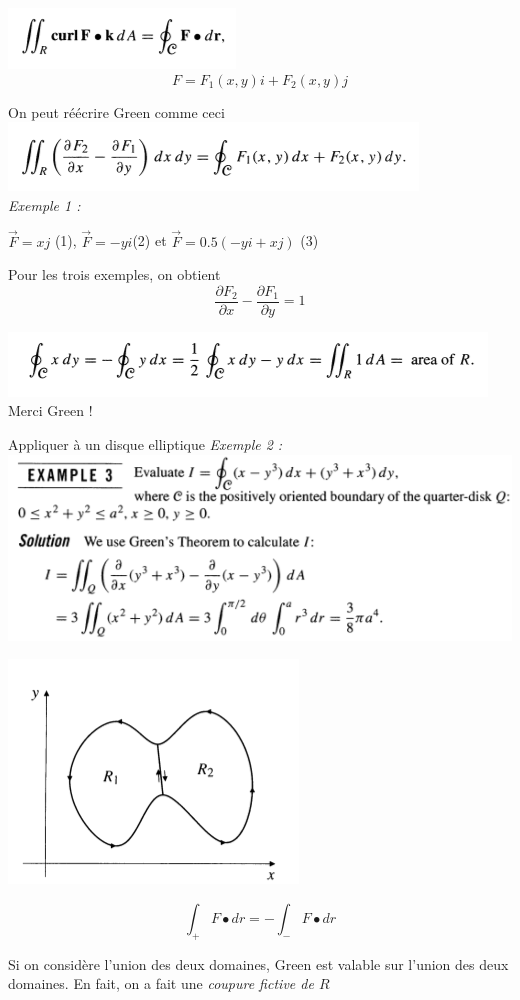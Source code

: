 \includegraphics[scale=0.7]{image4.png}\\

\[F=F_1(x,y)i+F_2(x,y)j\]

On peut réécrire Green comme ceci\\
\includegraphics[scale=0.7]{image5.png}\\
\textit{
Exemple 1 : }

$\vec F=xj$ (1), $\vec F = -y i$(2) et $\vec F = 0.5 ( -y i +x j )$ (3)

Pour les trois exemples, on obtient \[\frac{\partial F_2}{\partial x}- \frac{\partial F_1}{\partial y} = 1\]

\includegraphics[scale=0.7]{image6.png}\\

Merci Green !

Appliquer à un disque elliptique
\textit{
Exemple 2 : }\\
\includegraphics[scale=0.7]{image7.png}\\

\begin{myrem}

\includegraphics[scale=0.8]{image8.png}

\[\int_+ F\bullet dr = - \int_- F\bullet dr\]

Si on considère l'union des deux domaines, Green est valable sur l'union des deux domaines. En fait, on a fait une \emph{coupure fictive de $R$}
\end{myrem}
